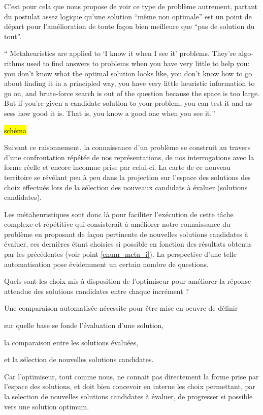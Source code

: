 C'est pour cela que \textcite[7]{Luke2013} nous propose de voir ce type de problème autrement, partant du postulat assez logique qu'une solution \enquote{même non optimale} est un point de départ pour l'amélioration de toute façon bien meilleure que \enquote{pas de solution du tout}.

\foreignquote{english}{ Metaheuristics are applied to \enquote{I know it when I see it} problems. They're algorithms used to find answers to problems when you have very little to help you: you don't know what the optimal solution looks like, you don't know how to go about finding it in a principled way, you have very little heuristic information to go on, and brute-force search is out of the question because the space is too large. But if you're given a candidate solution to your problem, you can test it and assess how good it is. That is, you know a good one when you see it.}  

\hl{schéma}

Suivant ce raisonnement, la connaissance d'un problème se construit au travers d'une confrontation répétée de nos représentations, de nos interrogations avec la forme réelle et encore inconnue prise par celui-ci. La carte de ce nouveau territoire se révélant peu à peu dans la projection sur l'espace des solutions des choix effectués lors de la sélection des nouveaux candidats à évaluer (solutions candidates).

Les métaheuristiques sont donc là pour faciliter l'exécution de cette tâche complexe et répétitive qui consisterait à améliorer notre connaissance du problème en proposant de façon pertinente de nouvelles solutions candidates à évaluer, ces dernières étant choisies si possible en fonction des résultats obtenus par les précédentes (voir point \ref{enum_meta_i}). La perspective d'une telle automatisation pose évidemment un certain nombre de questions. 

Quels sont les choix mis à disposition de l'optimiseur pour améliorer la réponse attendue des solutions candidates entre chaque incrément ? \autocite[19]{Weise2011} 

Une comparaison automatisée nécessite pour être mise en oeuvre de définir \begin{enumerate*}[label=(\alph*)]
\item sur quelle base se fonde l'évaluation d'une solution,
\item la comparaison entre les solutions évaluées, 
\item et la sélection de nouvelles solutions candidates.\end{enumerate*} Car l'optimiseur, tout comme nous, ne connait pas directement la forme prise par l'espace des solutions, et doit bien concevoir en interne les choix permettant, par la selection de nouvelles solutions candidates à évaluer, de progresser si possible vers une solution optimum.

